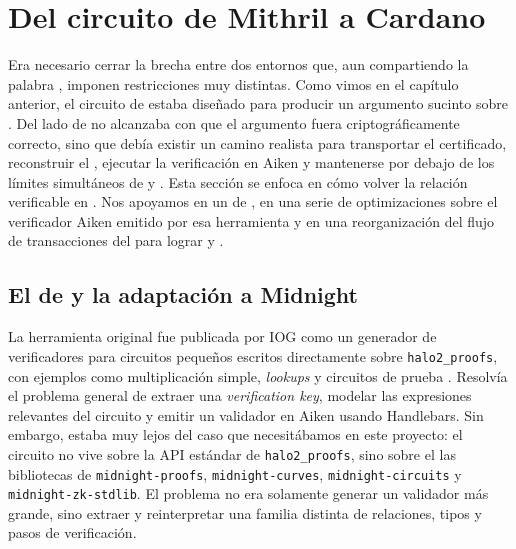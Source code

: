 
\section{Del circuito \texorpdfstring{\HaloTwo}{HaloTwo} de Mithril a Cardano}

Era necesario cerrar la brecha entre dos entornos que, aun compartiendo la palabra \HaloTwo, imponen restricciones muy distintas. Como vimos en el capítulo anterior, el circuito \MidnightSTMCircuit de \Mithril estaba diseñado para producir un argumento sucinto sobre \BLS. Del lado de \Cardano no alcanzaba con que el argumento fuera criptográficamente correcto, sino que debía existir un camino realista para transportar el certificado, reconstruir el \transcript, ejecutar la verificación en Aiken y mantenerse por debajo de los límites simultáneos de \maxTxExUnits y \maxTxSize. Esta sección se enfoca en cómo volver la relación \STMRelation verificable \Onchain en \Cardano. Nos apoyamos en un \fork de \PlutusHaloTwoVerifierGen, en una serie de optimizaciones sobre el verificador Aiken emitido por esa herramienta y en una reorganización del flujo de transacciones del \zkBridge para lograr \StakeDistTx y \MintTx.

\subsection{El \fork de \PlutusHaloTwoVerifierGen y la adaptación a Midnight}

La herramienta original \PlutusHaloTwoVerifierGen fue publicada por IOG como un generador de verificadores para circuitos pequeños escritos directamente sobre \texttt{halo2\_proofs}, con ejemplos como multiplicación simple, \textit{lookups} y circuitos de prueba \cite{PlutusHalo2VerifierGenRepo, IOGHalo2PlutusVerifier}. Resolvía el problema general de extraer una \textit{verification key}, modelar las expresiones relevantes del circuito y emitir un validador en Aiken usando Handlebars. Sin embargo, estaba muy lejos del caso que necesitábamos en este proyecto: el circuito \MidnightSTMCircuit no vive sobre la API estándar de \texttt{halo2\_proofs}, sino sobre el las bibliotecas de \Midnight \texttt{midnight-proofs}, \texttt{midnight-curves}, \texttt{midnight-circuits} y \texttt{midnight-zk-stdlib}. El problema no era solamente generar un validador más grande, sino extraer y reinterpretar una familia distinta de relaciones, tipos y pasos de verificación.


